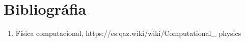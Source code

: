 \documentclass[12pt,a4paper]{article}
\begin{document}
\section*{Bibliográfia}
\begin{enumerate}
	\item Física computacional, https://es.qaz.wiki/wiki/Computational\_ physics
\end{enumerate}
\end{document}
